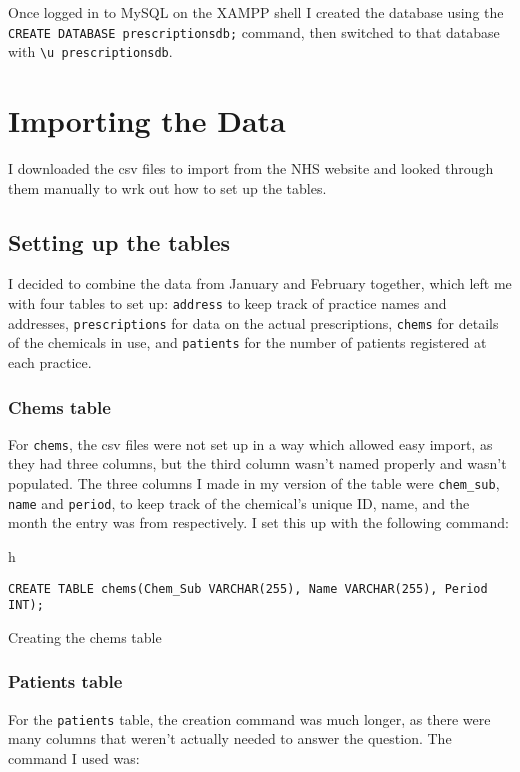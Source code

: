 \documentclass{report}
\begin{document}
Once logged in to MySQL on the XAMPP shell I created the database using the \texttt{CREATE DATABASE prescriptionsdb;} command, then switched to that database with \texttt{\textbackslash u prescriptionsdb}.
\chapter{Importing the Data}
I downloaded the csv files to import from the NHS website \cite{nhsprescriptiondata, nhspatientdata} and looked through them manually to wrk out how to set up the tables.

\section{Setting up the tables}
I decided to combine the data from January and February together, which left me with four tables to set up: \texttt{address} to keep track of practice names and addresses, \texttt{prescriptions} for data on the actual prescriptions, \texttt{chems} for details of the chemicals in use, and \texttt{patients} for the number of patients registered at each practice.

\subsection{Chems table}
For \texttt{chems}, the csv files were not set up in a way which allowed easy import, as they had three columns, but the third column wasn't named properly and wasn't populated. The three columns I made in my version of the table were \texttt{chem\_sub}, \texttt{name} and \texttt{period}, to keep track of the chemical's unique ID, name, and the month the entry was from respectively. I set this up with the following command:

\begin{listing}{h}
\begin{verbatim}
CREATE TABLE chems(Chem_Sub VARCHAR(255), Name VARCHAR(255), Period INT);
\end{verbatim}
\caption{Creating the chems table}
\label{lst: creating chems table}
\end{listing}

\subsection{Patients table}
For the \texttt{patients} table, the creation command was much longer, as there were many columns that weren't actually needed to answer the question. The command I used was:
\end{document}

